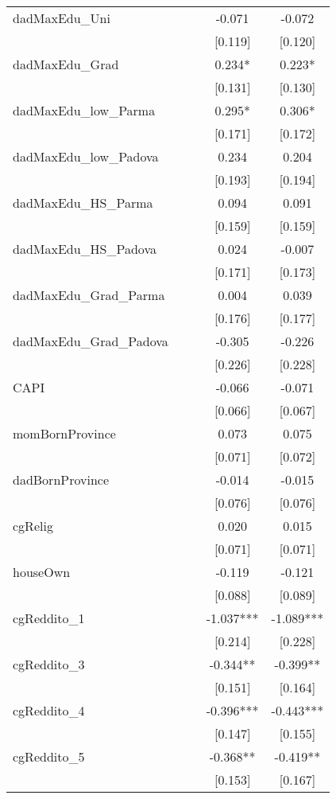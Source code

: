 \documentclass[]{article}
\begin{document}
\begin{tabular}{lcccc}
dadMaxEdu\_Uni &  &  & -0.071 & -0.072 \\
 &  &  & [0.119] & [0.120] \\
dadMaxEdu\_Grad &  &  & 0.234* & 0.223* \\
 &  &  & [0.131] & [0.130] \\
dadMaxEdu\_low\_Parma &  &  & 0.295* & 0.306* \\
 &  &  & [0.171] & [0.172] \\
dadMaxEdu\_low\_Padova &  &  & 0.234 & 0.204 \\
 &  &  & [0.193] & [0.194] \\
dadMaxEdu\_HS\_Parma &  &  & 0.094 & 0.091 \\
 &  &  & [0.159] & [0.159] \\
dadMaxEdu\_HS\_Padova &  &  & 0.024 & -0.007 \\
 &  &  & [0.171] & [0.173] \\
dadMaxEdu\_Grad\_Parma &  &  & 0.004 & 0.039 \\
 &  &  & [0.176] & [0.177] \\
dadMaxEdu\_Grad\_Padova &  &  & -0.305 & -0.226 \\
 &  &  & [0.226] & [0.228] \\
CAPI &  &  & -0.066 & -0.071 \\
 &  &  & [0.066] & [0.067] \\
momBornProvince &  &  & 0.073 & 0.075 \\
 &  &  & [0.071] & [0.072] \\
dadBornProvince &  &  & -0.014 & -0.015 \\
 &  &  & [0.076] & [0.076] \\
cgRelig &  &  & 0.020 & 0.015 \\
 &  &  & [0.071] & [0.071] \\
houseOwn &  &  & -0.119 & -0.121 \\
 &  &  & [0.088] & [0.089] \\
cgReddito\_1 &  &  & -1.037*** & -1.089*** \\
 &  &  & [0.214] & [0.228] \\
cgReddito\_3 &  &  & -0.344** & -0.399** \\
 &  &  & [0.151] & [0.164] \\
cgReddito\_4 &  &  & -0.396*** & -0.443*** \\
 &  &  & [0.147] & [0.155] \\
cgReddito\_5 &  &  & -0.368** & -0.419** \\
 &  &  & [0.153] & [0.167] \\

\end{tabular}
\end{document}
